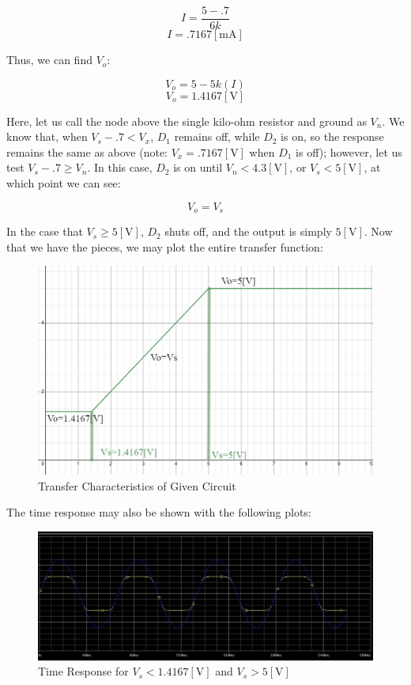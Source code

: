 \begin{enumerate}
    $$I=\frac{5-.7}{6k}$$
    $$I=.7167[\si{\milli\ampere}]$$

    Thus, we can find $V_o$:

    $$V_o=5-5k(I)$$
    $$\boxed{V_o=1.4167[\si{\volt}]}$$

    Here, let us call the node above the single kilo-ohm resistor and ground as $V_n$. We know that, when $V_s-.7<V_x$, $D_1$ remains off, while $D_2$ is on, so the response remains the same as above (note: $V_x=.7167[\si{\volt}]$ when $D_1$ is off); however, let us test $V_s-.7\geq V_n$. In this case, $D_2$ is on until $V_n<4.3[\si{\volt}]$, or $V_s<5[\si{\volt}]$, at which point we can see:

    $$V_o=V_s$$

    In the case that $V_s\geq 5[\si{\volt}]$, $D_2$ shuts off, and the output is simply $5[\si{\volt}]$. Now that we have the pieces, we may plot the entire transfer function:

    \begin{figure}[H]
      \centering
      \includegraphics[width=.9\textwidth]{Figures/HW4-4}
      \caption{Transfer Characteristics of Given Circuit}
      \label{fig:10}
    \end{figure}

    The time response may also be shown with the following plots:

    \begin{figure}[H]
      \centering
      \includegraphics[width=.9\textwidth]{Figures/HW4-42}
      \caption{Time Response for $V_s<1.4167[\si{\volt}]$ and $V_s>5[\si{\volt}]$}
      \label{fig:11}
    \end{figure}


\end{enumerate}
